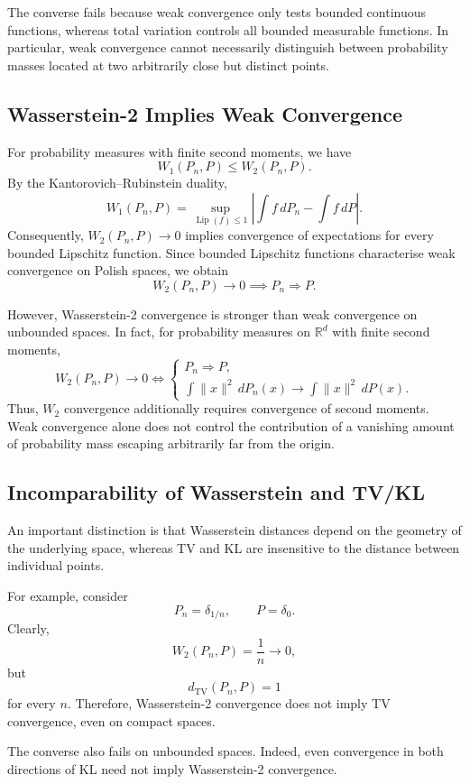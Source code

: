 \documentclass[
  11pt,
  a4paper,
  notitlepage
]{report}
\begin{document}
The converse fails because weak convergence only
tests bounded continuous functions, whereas total
variation controls all bounded measurable functions.
In particular, weak convergence cannot necessarily
distinguish between probability masses located at
two arbitrarily close but distinct points.

\subsection{Wasserstein-2 Implies Weak Convergence}

For probability measures with finite second moments,
we have
\[
W_1(P_n,P)\leq W_2(P_n,P).
\]
By the Kantorovich--Rubinstein duality,
\[
W_1(P_n,P)
=
\sup_{\operatorname{Lip}(f)\leq1}
\left|
\int f\,dP_n-\int f\,dP
\right|.
\]
Consequently, $W_2(P_n,P)\to0$ implies convergence
of expectations for every bounded Lipschitz function.
Since bounded Lipschitz functions characterise weak
convergence on Polish spaces, we obtain
\[
\boxed{
W_2(P_n,P)\to0
\implies P_n\Rightarrow P.
}
\]

However, Wasserstein-2 convergence is stronger than
weak convergence on unbounded spaces. In fact,
for probability measures on $\mathbb R^d$ with
finite second moments,
\[
\boxed{
W_2(P_n,P)\to0
\iff
\begin{cases}
P_n\Rightarrow P,\\
\displaystyle
\int\|x\|^2\,dP_n(x)
\to
\int\|x\|^2\,dP(x).
\end{cases}
}
\]
Thus, $W_2$ convergence additionally requires
convergence of second moments. Weak convergence
alone does not control the contribution of a
vanishing amount of probability mass escaping
arbitrarily far from the origin.

\subsection{Incomparability of Wasserstein and TV/KL}

An important distinction is that Wasserstein
distances depend on the geometry of the underlying
space, whereas TV and KL are insensitive to the
distance between individual points.

For example, consider
\[
P_n=\delta_{1/n},
\qquad P=\delta_0.
\]
Clearly,
\[
W_2(P_n,P)=\frac1n\longrightarrow0,
\]
but
\[
d_{\mathrm{TV}}(P_n,P)=1
\]
for every $n$. Therefore, Wasserstein-2 convergence
does not imply TV convergence, even on compact spaces.

The converse also fails on unbounded spaces.
Indeed, even convergence in both directions of KL
need not imply Wasserstein-2 convergence.
\end{document}
